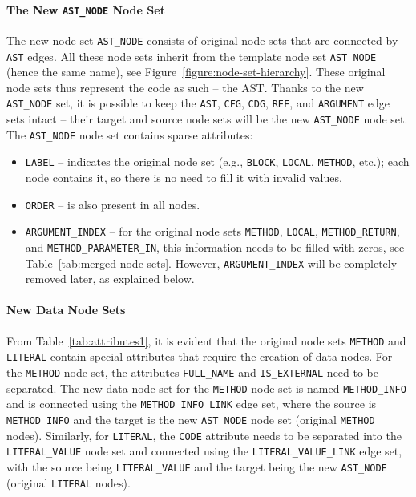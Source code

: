 \paragraph{The New \texttt{AST\_NODE} Node Set}
The new node set \texttt{AST\_NODE} consists of original node sets that are connected by \texttt{AST} edges. All these node sets inherit from the template node set \texttt{AST\_NODE} (hence the same name), see Figure~\ref{figure:node-set-hierarchy}. These original node sets thus represent the code as such -- the AST. Thanks to the new \texttt{AST\_NODE} set, it is possible to keep the \texttt{AST}, \texttt{CFG}, \texttt{CDG}, \texttt{REF}, and \texttt{ARGUMENT} edge sets intact -- their target and source node sets will be the new \texttt{AST\_NODE} node set. The \texttt{AST\_NODE} node set contains sparse attributes:
\begin{itemize}
    \item \texttt{LABEL} -- indicates the original node set (e.g., \texttt{BLOCK}, \texttt{LOCAL}, \texttt{METHOD}, etc.); each node contains it, so there is no need to fill it with invalid values.
    \item \texttt{ORDER} -- is also present in all nodes.
    \item \texttt{ARGUMENT\_INDEX} -- for the original node sets \texttt{METHOD}, \texttt{LOCAL}, \texttt{METHOD\_RETURN}, and \texttt{METHOD\_PARAMETER\_IN}, this information needs to be filled with zeros, see Table~\ref{tab:merged-node-sets}. However, \texttt{ARGUMENT\_INDEX} will be completely removed later, as explained below.
\end{itemize}

\paragraph{New Data Node Sets}
From Table~\ref{tab:attributes1}, it is evident that the original node sets \texttt{METHOD} and \texttt{LITERAL} contain special attributes that require the creation of data nodes. For the \texttt{METHOD} node set, the attributes \texttt{FULL\_NAME} and \texttt{IS\_EXTERNAL} need to be separated. The new data node set for the \texttt{METHOD} node set is named \texttt{METHOD\_INFO} and is connected using the \texttt{METHOD\_INFO\_LINK} edge set, where the source is \texttt{METHOD\_INFO} and the target is the new \texttt{AST\_NODE} node set (original \texttt{METHOD} nodes). Similarly, for \texttt{LITERAL}, the \texttt{CODE} attribute needs to be separated into the \texttt{LITERAL\_VALUE} node set and connected using the \texttt{LITERAL\_VALUE\_LINK} edge set, with the source being \texttt{LITERAL\_VALUE} and the target being the new \texttt{AST\_NODE} (original \texttt{LITERAL} nodes).

